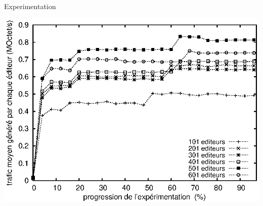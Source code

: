 \begin{frame}{\CRATE}{Experimentation}

  \begin{center}
    \includegraphics[width=1\textwidth]{img/editor/communication.eps}
  \end{center}

\end{frame}